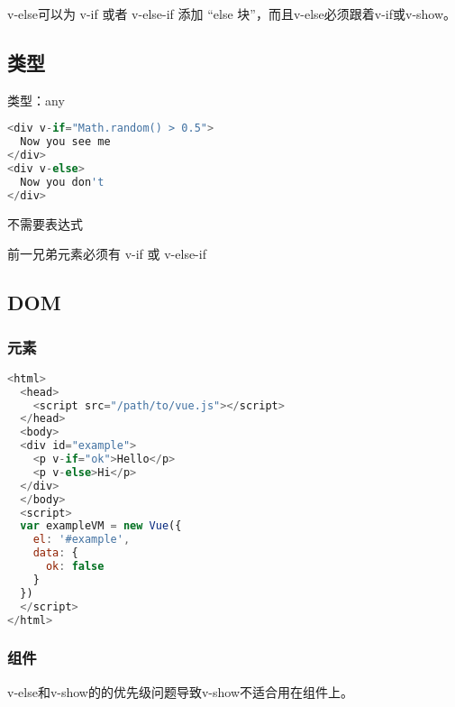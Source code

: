 v-else可以为 v-if 或者 v-else-if 添加 “else 块”，而且v-else必须跟着v-if或v-show。


\subsection{类型}

\begin{compactitem}
\item 类型：any
\end{compactitem}


\begin{lstlisting}[language=JavaScript]
<div v-if="Math.random() > 0.5">
  Now you see me
</div>
<div v-else>
  Now you don't
</div>
\end{lstlisting}

\begin{compactitem}
\item 不需要表达式
\item 前一兄弟元素必须有 v-if 或 v-else-if
\end{compactitem}


\subsection{DOM}

\subsubsection{元素}


\begin{lstlisting}[language=JavaScript]
<html>
  <head>
    <script src="/path/to/vue.js"></script>
  </head>
  <body>
  <div id="example">
    <p v-if="ok">Hello</p>
    <p v-else>Hi</p>
  </div>
  </body>
  <script>
  var exampleVM = new Vue({
    el: '#example',
    data: {
      ok: false
    }
  })
  </script>
</html>
\end{lstlisting}


\subsubsection{组件}

v-else和v-show的的优先级问题导致v-show不适合用在组件上。

